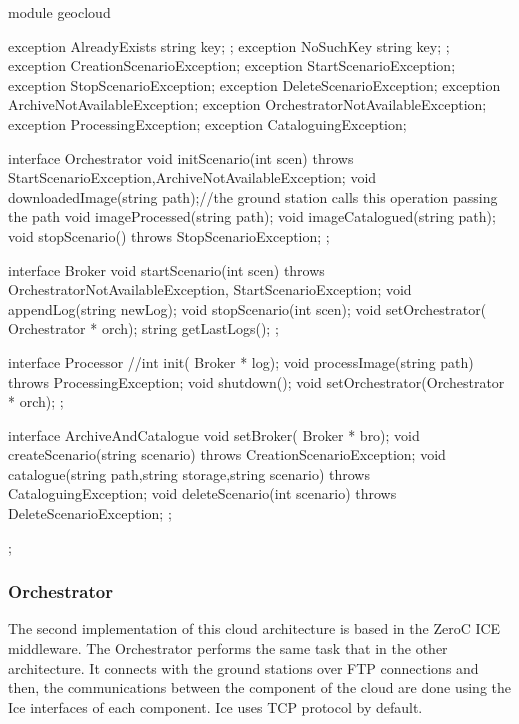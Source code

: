 \begin{listing}[
  float=h!,
  caption  = {Interfaces of ICE application},
  label    = code:ice-slice,
style=customc]

module geocloud {
    exception AlreadyExists { string key; };
    exception NoSuchKey { string key; };
    exception CreationScenarioException{};
    exception StartScenarioException{};
    exception StopScenarioException{};
    exception DeleteScenarioException{};
    exception ArchiveNotAvailableException{};
    exception OrchestratorNotAvailableException{};
    exception ProcessingException{};
    exception CataloguingException{};

    interface Orchestrator{
    	void initScenario(int scen) throws StartScenarioException,ArchiveNotAvailableException;
	void downloadedImage(string path);//the ground station calls this operation passing the path
	void imageProcessed(string path);
	void imageCatalogued(string path);
	void stopScenario() throws StopScenarioException;
    };

    interface Broker{
	void startScenario(int scen) throws OrchestratorNotAvailableException, StartScenarioException;
	void appendLog(string newLog);
	void stopScenario(int scen);
	void setOrchestrator( Orchestrator * orch);
	string getLastLogs();
    };


 interface Processor{
	//int init( Broker * log);
       	void processImage(string path) throws ProcessingException;
	void shutdown();
	void setOrchestrator(Orchestrator * orch);
    };



    interface ArchiveAndCatalogue{
	void setBroker( Broker * bro);
	void createScenario(string scenario) throws CreationScenarioException;
	void catalogue(string path,string storage,string scenario) throws CataloguingException;
	void deleteScenario(int scenario) throws DeleteScenarioException;
    };
};
\end{listing}

\subsubsection{Orchestrator}

The second implementation of this cloud architecture is based in the ZeroC ICE
middleware. The Orchestrator performs the same task that in the other
architecture. It connects with the ground stations over \ac{FTP} connections and
then, the communications between the component of the cloud are done using the
Ice interfaces of each component. Ice uses \ac{TCP} protocol by default.

